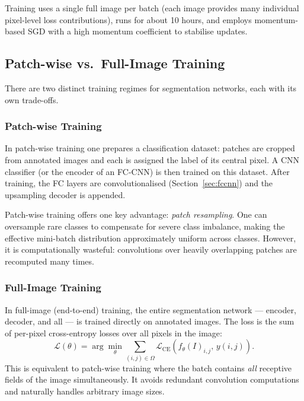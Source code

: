 \documentclass[11pt,a4paper]{article}
\begin{document}
Training uses a single full image per batch (each image provides many individual pixel-level loss contributions), runs for about 10 hours, and employs momentum-based SGD with a high momentum coefficient to stabilise updates.

\subsection{Patch-wise vs.\ Full-Image Training}
\label{sec:training_modes}

There are two distinct training regimes for segmentation networks, each with its own trade-offs.

\subsubsection{Patch-wise Training}

In patch-wise training one prepares a classification dataset: patches are cropped from annotated images and each is assigned the label of its central pixel. A CNN classifier (or the encoder of an FC-CNN) is then trained on this dataset. After training, the FC layers are convolutionalised (Section~\ref{sec:fccnn}) and the upsampling decoder is appended.

Patch-wise training offers one key advantage: \emph{patch resampling}. One can oversample rare classes to compensate for severe class imbalance, making the effective mini-batch distribution approximately uniform across classes. However, it is computationally wasteful: convolutions over heavily overlapping patches are recomputed many times.

\subsubsection{Full-Image Training}

In full-image (end-to-end) training, the entire segmentation network — encoder, decoder, and all — is trained directly on annotated images. The loss is the sum of per-pixel cross-entropy losses over all pixels in the image:
\[
  \mathcal{L}(\theta) = \arg\min_\theta \sum_{(i,j)\in\Omega} \mathcal{L}_{\text{CE}}\!\left(f_\theta(I)_{i,j},\, y(i,j)\right).
\]
This is equivalent to patch-wise training where the batch contains \emph{all} receptive fields of the image simultaneously. It avoids redundant convolution computations and naturally handles arbitrary image sizes.
\end{document}
